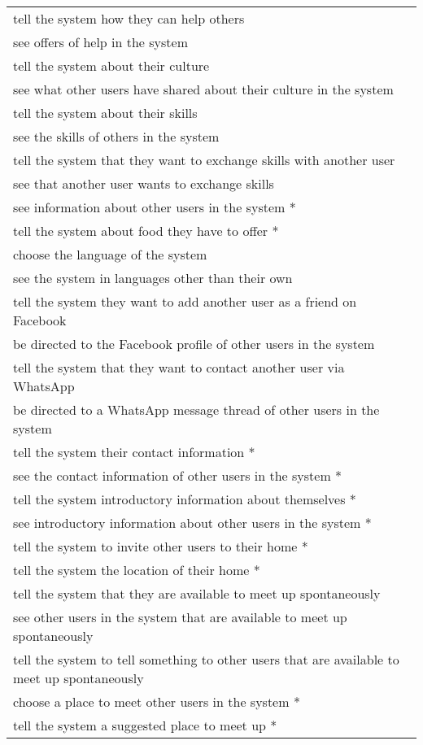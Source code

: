 \begin{longtable}{p{}}
tell the system how they can help others \\
see offers of help in the system \\
tell the system about their culture \\
see what other users have shared about their culture in the system \\
tell the system about their skills \\
see the skills of others in the system \\
tell the system that they want to exchange skills with another user \\
see that another user wants to exchange skills \\
see information about other users in the system * \\
tell the system about food they have to offer * \\
choose the language of the system \\
see the system in languages other than their own \\
tell the system they want to add another user as a friend on Facebook \\
be directed to the Facebook profile of other users in the system \\
tell the system that they want to contact another user via WhatsApp \\
be directed to a WhatsApp message thread of other users in the system \\
tell the system their contact information * \\
see the contact information of other users in the system  * \\
tell the system introductory information about themselves * \\
see introductory information about other users in the system  * \\
tell the system to invite other users to their home * \\
tell the system the location of their home  * \\
tell the system that they are available to meet up spontaneously \\
see other users in the system that are available to meet up spontaneously \\
tell the system to tell something to other users that are available to meet up spontaneously \\
choose a place to meet other users in the system  * \\
tell the system a suggested place to meet up  * \\

\end{longtable}
